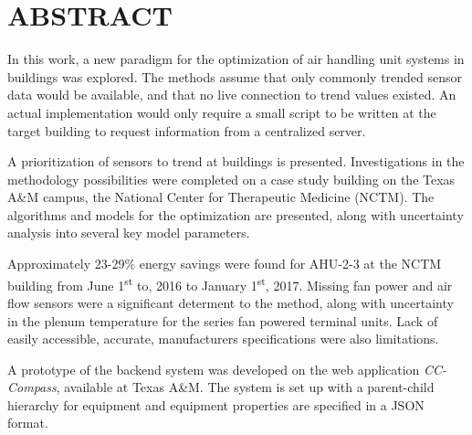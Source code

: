 %
%
%

\chapter*{ABSTRACT}

\pagestyle{plain} %
\setcounter{page}{2}

\indent  In this work, a new paradigm for the optimization of air
handling unit systems in buildings was explored. The methods assume
that only commonly trended sensor data would be available, and that no
live connection to trend values existed. An actual implementation would
only require a small script to be written at the target building to
request information from a centralized server. 

A prioritization of sensors to trend at buildings is presented.
Investigations in the methodology possibilities were completed on a case study
building on the Texas A\&M campus, the National Center for Therapeutic
Medicine (NCTM). The algorithms and models for the optimization are
presented, along with uncertainty analysis into several key model
parameters. 

Approximately 23-29\% energy savings were found for AHU-2-3 at the NCTM
building from June 1\textsuperscript{st} to, 2016 to January
1\textsuperscript{st}, 2017.  Missing fan power and air flow sensors were a significant
determent to the method, along with uncertainty in the plenum
temperature for the series fan powered terminal units. Lack of easily
accessible, accurate, manufacturers specifications were also
limitations.  

A prototype of the backend system was developed on the web application
\textit{CC-Compass}, available at Texas A\&M. The system is set up with
a parent-child hierarchy for equipment and equipment properties are
specified in a JSON format. 
 

\pagebreak{}
